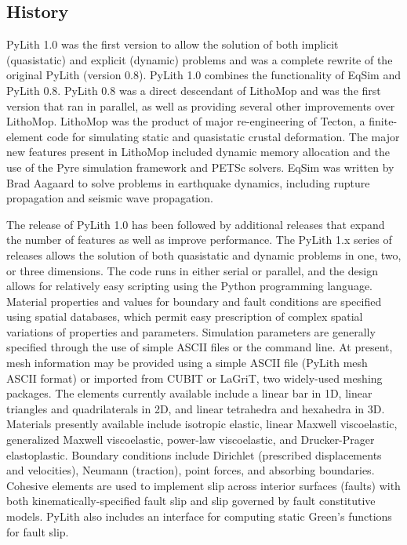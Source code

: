 \begin{itemize}
\section{History}

PyLith 1.0 was the first version to allow the solution of both
implicit (quasistatic) and explicit (dynamic) problems and was a
complete rewrite of the original PyLith (version 0.8). PyLith 1.0
combines the functionality of EqSim
\cite{Aagaard:etal:2001a,Aagaard:etal:2001b} and PyLith 0.8. PyLith
0.8 was a direct descendant of LithoMop and was the first version that
ran in parallel, as well as providing several other improvements over
LithoMop. LithoMop was the product of major re-engineering of Tecton, a
finite-element code for simulating static and quasistatic crustal
deformation. The major new features present in LithoMop included
dynamic memory allocation and the use of the Pyre simulation framework
and PETSc solvers. EqSim was written by Brad Aagaard to solve problems
in earthquake dynamics, including rupture propagation and seismic wave
propagation.

The release of PyLith 1.0 has been followed by additional releases
that expand the number of features as well as improve performance.
The PyLith 1.x series of releases allows the solution of both
quasistatic and dynamic problems in one, two, or three
dimensions. The code runs in either serial or parallel, and the design
allows for relatively easy scripting using the Python programming
language. Material properties and values for boundary and fault
conditions are specified using spatial databases, which permit easy
prescription of complex spatial variations of properties and
parameters. Simulation parameters are generally specified through the
use of simple ASCII files or the command line.  At present, mesh
information may be provided using a simple ASCII file (PyLith mesh
ASCII format) or imported from CUBIT or LaGriT, two widely-used
meshing packages. The elements currently available include a linear
bar in 1D, linear triangles and quadrilaterals in 2D, and linear
tetrahedra and hexahedra in 3D. Materials presently available include
isotropic elastic, linear Maxwell viscoelastic, generalized Maxwell
viscoelastic, power-law viscoelastic, and Drucker-Prager
elastoplastic. Boundary conditions include Dirichlet (prescribed
displacements and velocities), Neumann (traction), point forces, and
absorbing boundaries.  Cohesive elements are used to implement slip
across interior surfaces (faults) with both kinematically-specified
fault slip and slip governed by fault constitutive models. PyLith also
includes an interface for computing static Green's functions for fault
slip.


\end{itemize}
